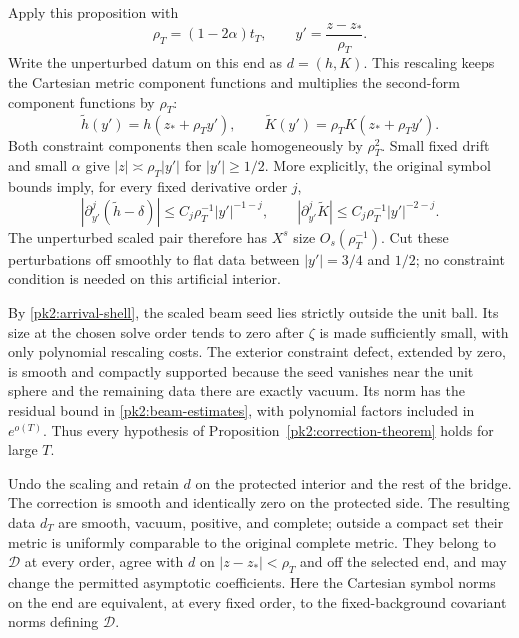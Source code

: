 Apply this proposition with
\begin{equation}
 \rho_T=(1-2\alpha)t_T,
 \qquad y'=\frac{z-z_*}{\rho_T}.
 \label{pk2:rescaling}
\end{equation}
Write the unperturbed datum on this end as $d=(h,K)$.
This rescaling keeps the Cartesian metric component functions and
multiplies the second-form component functions by $\rho_T$:
\begin{equation}\label{pk:constraint-rescaling}
 \widetilde h(y')=h(z_*+\rho_Ty'),\qquad
 \widetilde K(y')=\rho_TK(z_*+\rho_Ty').
\end{equation}
Both constraint components then scale homogeneously by $\rho_T^2$.
Small fixed
drift and small $\alpha$ give $|z|\asymp\rho_T|y'|$ for
$|y'|\ge1/2$. More explicitly, the original symbol bounds imply,
for every fixed derivative order $j$,
\begin{equation}\label{pk:constraint-background}
 |\partial_{y'}^j(\widetilde h-\delta)|
       \le C_j\rho_T^{-1}|y'|^{-1-j},\qquad
 |\partial_{y'}^j\widetilde K|
       \le C_j\rho_T^{-1}|y'|^{-2-j}.
\end{equation}
The unperturbed scaled pair therefore has $X^s$ size
$O_s(\rho_T^{-1})$. Cut these perturbations off smoothly to flat
data between $|y'|=3/4$ and $1/2$; no constraint condition is
needed on this artificial interior.

By \eqref{pk2:arrival-shell}, the scaled beam seed lies strictly
outside the unit ball. Its size at the chosen solve order tends
to zero after $\zeta$ is made sufficiently small, with only
polynomial rescaling costs. The exterior constraint defect,
extended by zero, is smooth and compactly supported because
the seed vanishes near the unit sphere and the remaining data
there are exactly vacuum. Its norm has the residual bound in
\eqref{pk2:beam-estimates}, with polynomial factors included in
$e^{o(T)}$. Thus every hypothesis of
Proposition~\ref{pk2:correction-theorem} holds for large $T$.

Undo the scaling and retain $d$ on the protected interior and
the rest of the bridge. The correction is smooth and identically
zero on the protected side. The resulting data $d_T$ are smooth,
vacuum, positive, and complete; outside a compact set their metric
is uniformly comparable to the original complete metric. They
belong to $\mathcal D$ at every order, agree with $d$ on
$|z-z_*|<\rho_T$ and off the selected end, and may change the
permitted asymptotic coefficients. Here the Cartesian symbol norms
on the end are equivalent, at every fixed order, to the
fixed-background covariant norms defining $\mathcal D$.

